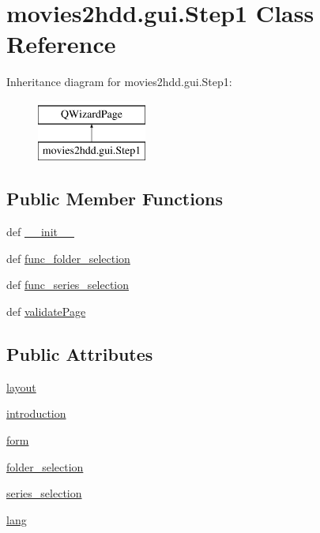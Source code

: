 \hypertarget{classmovies2hdd_1_1gui_1_1_step1}{\section{movies2hdd.\-gui.\-Step1 Class Reference}
\label{classmovies2hdd_1_1gui_1_1_step1}
}
Inheritance diagram for movies2hdd.\-gui.\-Step1\-:\begin{figure}[H]
\begin{center}
\leavevmode
\includegraphics[height=2.000000cm]{classmovies2hdd_1_1gui_1_1_step1}
\end{center}
\end{figure}
\subsection*{Public Member Functions}
\begin{DoxyCompactItemize}
\item 
def \hyperlink{classmovies2hdd_1_1gui_1_1_step1_a7f77eb118cf3ec7debd009cdcedacb8f}{\-\_\-\-\_\-init\-\_\-\-\_\-}
\item 
def \hyperlink{classmovies2hdd_1_1gui_1_1_step1_a3268d2a740327b03b1af10c02ae6e10e}{func\-\_\-folder\-\_\-selection}
\item 
def \hyperlink{classmovies2hdd_1_1gui_1_1_step1_a93e5715186ec42ee18c1c5a0f75c54c4}{func\-\_\-series\-\_\-selection}
\item 
def \hyperlink{classmovies2hdd_1_1gui_1_1_step1_a4e623adf8d17a21563f58250e0fc4996}{validate\-Page}
\end{DoxyCompactItemize}
\subsection*{Public Attributes}
\begin{DoxyCompactItemize}
\item 
\hyperlink{classmovies2hdd_1_1gui_1_1_step1_ac872defae6a2ec8fa87724017327180f}{layout}
\item 
\hyperlink{classmovies2hdd_1_1gui_1_1_step1_a682a18695266e8fecbd3df9151f76e4a}{introduction}
\item 
\hyperlink{classmovies2hdd_1_1gui_1_1_step1_adef1bafe9ac90f458d6ef9597b3248b9}{form}
\item 
\hyperlink{classmovies2hdd_1_1gui_1_1_step1_a88c314f92883ddbe7c73ef89f7925929}{folder\-\_\-selection}
\item 
\hyperlink{classmovies2hdd_1_1gui_1_1_step1_a7de4eabf338df8f4e5ebad68f8235d78}{series\-\_\-selection}
\item 
\hyperlink{classmovies2hdd_1_1gui_1_1_step1_abd8a0c304da63971d4941db343634d11}{lang}
\end{DoxyCompactItemize}


